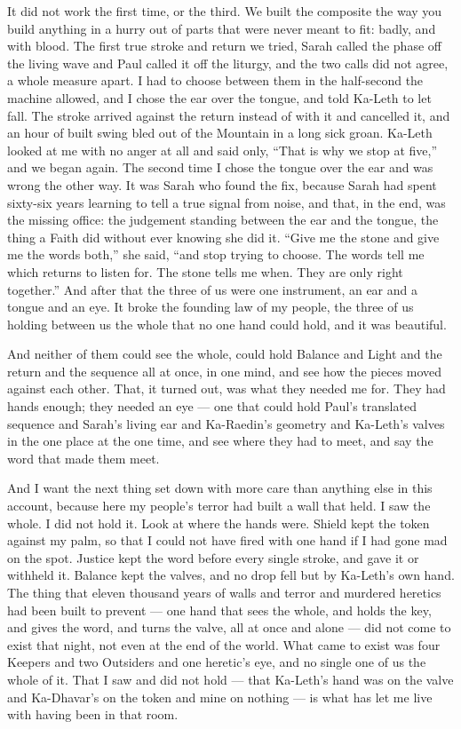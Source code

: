 It did not work the first time, or the third. We built the composite the way you build anything in a hurry out of parts that were never meant to fit: badly, and with blood. The first true stroke and return we tried, Sarah called the phase off the living wave and Paul called it off the liturgy, and the two calls did not agree, a whole measure apart. I had to choose between them in the half-second the machine allowed, and I chose the ear over the tongue, and told Ka-Leth to let fall. The stroke arrived against the return instead of with it and cancelled it, and an hour of built swing bled out of the Mountain in a long sick groan. Ka-Leth looked at me with no anger at all and said only, ``That is why we stop at five,'' and we began again. The second time I chose the tongue over the ear and was wrong the other way. It was Sarah who found the fix, because Sarah had spent sixty-six years learning to tell a true signal from noise, and that, in the end, was the missing office: the judgement standing between the ear and the tongue, the thing a Faith did without ever knowing she did it. ``Give me the stone and give me the words both,'' she said, ``and stop trying to choose. The words tell me which returns to listen for. The stone tells me when. They are only right together.'' And after that the three of us were one instrument, an ear and a tongue and an eye. It broke the founding law of my people, the three of us holding between us the whole that no one hand could hold, and it was beautiful.\par

And neither of them could see the whole, could hold Balance and Light and the return and the sequence all at once, in one mind, and see how the pieces moved against each other. That, it turned out, was what they needed me for. They had hands enough; they needed an eye --- one that could hold Paul's translated sequence and Sarah's living ear and Ka-Raedin's geometry and Ka-Leth's valves in the one place at the one time, and see where they had to meet, and say the word that made them meet.\par

And I want the next thing set down with more care than anything else in this account, because here my people's terror had built a wall that held. I saw the whole. I did not hold it. Look at where the hands were. Shield kept the token against my palm, so that I could not have fired with one hand if I had gone mad on the spot. Justice kept the word before every single stroke, and gave it or withheld it. Balance kept the valves, and no drop fell but by Ka-Leth's own hand. The thing that eleven thousand years of walls and terror and murdered heretics had been built to prevent --- one hand that sees the whole, and holds the key, and gives the word, and turns the valve, all at once and alone --- did not come to exist that night, not even at the end of the world. What came to exist was four Keepers and two Outsiders and one heretic's eye, and no single one of us the whole of it. That I saw and did not hold --- that Ka-Leth's hand was on the valve and Ka-Dhavar's on the token and mine on nothing --- is what has let me live with having been in that room.\par

